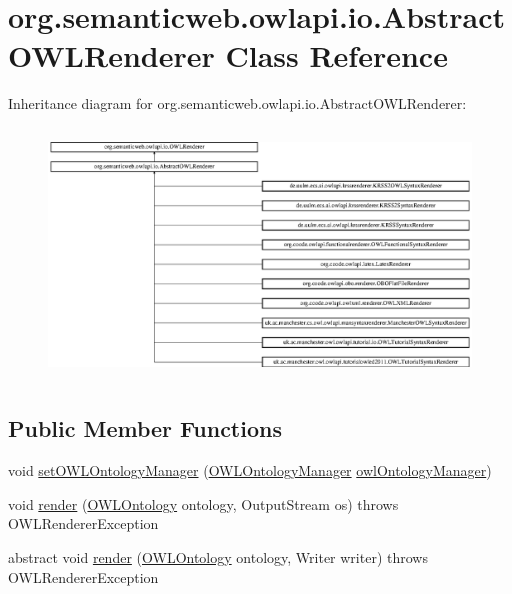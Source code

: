 \hypertarget{classorg_1_1semanticweb_1_1owlapi_1_1io_1_1_abstract_o_w_l_renderer}{\section{org.\-semanticweb.\-owlapi.\-io.\-Abstract\-O\-W\-L\-Renderer Class Reference}
\label{classorg_1_1semanticweb_1_1owlapi_1_1io_1_1_abstract_o_w_l_renderer}
}
Inheritance diagram for org.\-semanticweb.\-owlapi.\-io.\-Abstract\-O\-W\-L\-Renderer\-:\begin{figure}[H]
\begin{center}
\leavevmode
\includegraphics[height=6.679921cm]{classorg_1_1semanticweb_1_1owlapi_1_1io_1_1_abstract_o_w_l_renderer}
\end{center}
\end{figure}
\subsection*{Public Member Functions}
\begin{DoxyCompactItemize}
\item 
void \hyperlink{classorg_1_1semanticweb_1_1owlapi_1_1io_1_1_abstract_o_w_l_renderer_a749ccc31294dc65d0b29088f0d69107a}{set\-O\-W\-L\-Ontology\-Manager} (\hyperlink{interfaceorg_1_1semanticweb_1_1owlapi_1_1model_1_1_o_w_l_ontology_manager}{O\-W\-L\-Ontology\-Manager} \hyperlink{classorg_1_1semanticweb_1_1owlapi_1_1io_1_1_abstract_o_w_l_renderer_abb9888586f19a7a923cba542d99f1556}{owl\-Ontology\-Manager})
\item 
void \hyperlink{classorg_1_1semanticweb_1_1owlapi_1_1io_1_1_abstract_o_w_l_renderer_afeaffb8f00c323cb2feb74a494781327}{render} (\hyperlink{interfaceorg_1_1semanticweb_1_1owlapi_1_1model_1_1_o_w_l_ontology}{O\-W\-L\-Ontology} ontology, Output\-Stream os)  throws O\-W\-L\-Renderer\-Exception 
\item 
abstract void \hyperlink{classorg_1_1semanticweb_1_1owlapi_1_1io_1_1_abstract_o_w_l_renderer_af63991e15c4b152e1f8013582c119bf5}{render} (\hyperlink{interfaceorg_1_1semanticweb_1_1owlapi_1_1model_1_1_o_w_l_ontology}{O\-W\-L\-Ontology} ontology, Writer writer)  throws O\-W\-L\-Renderer\-Exception
\end{DoxyCompactItemize}
